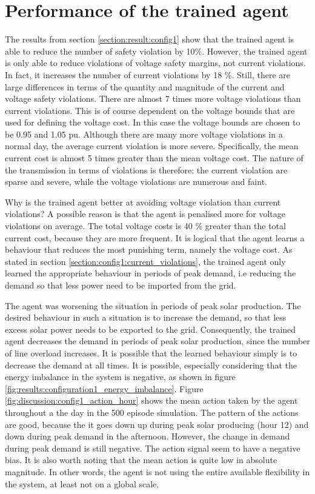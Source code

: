 \documentclass[class=book, crop=false]{standalone}
\begin{document}
\section{Performance of the trained agent}
The results from section \ref{section:result:config1} show that the trained agent is able to reduce the number of safety violation by 10\%. However, the trained agent is only able to reduce violations of voltage safety margins, not current violations. In fact, it increases the number of current violations by 18 \%. Still, there are large differences in terms of the quantity and magnitude of the current and voltage safety violations. There are almost 7 times more voltage violations than current violations. This is of course dependent on the voltage bounds that are used for defining the voltage cost. In this case the voltage bounds are chosen to be 0.95 and 1.05 pu. Although there are many more voltage violations in a normal day, the average current violation is more severe. Specifically, the mean current cost is almost 5 times greater than the mean voltage cost. The nature of the transmission in terms of violations is therefore: the current violation are sparse and severe, while the voltage violations are numerous and faint. 

Why is the trained agent better at avoiding voltage violation than current violations? A possible reason is that the agent is penalised more for voltage violations on average. The total voltage costs is 40 \% greater than the total current cost, because they are more frequent. It is logical that the agent learns a behaviour that reduces the most punishing term, namely the voltage cost. As stated in section \ref{section:config1:current_violations}, the trained agent only learned the appropriate behaviour in periods of peak demand, i.e reducing the demand so that less power need to be imported from the grid.

The agent was worsening the situation in periods of peak solar production. The desired behaviour in such a situation is to increase the demand, so that less excess solar power needs to be exported to the grid. Consequently, the trained agent decreases the demand in periods of peak solar production, since the number of line overload increases. It is possible that the learned behaviour simply is to decrease the demand at all times. It is possible, especially considering that the energy imbalance in the system is negative, as shown in figure \ref{fig:results:configuration1_energy_imbalance}. Figure \ref{fig:discussion:config1_action_hour} shows the mean action taken by the agent throughout a the day in the 500 episode simulation. The pattern of the actions are good, because the it goes down up during peak solar producing (hour 12) and down during peak demand in the afternoon. However, the change in demand during peak demand is still negative. The action signal seem to have a negative bias. It is also worth noting that the mean action is quite low in absolute magnitude. In other words, the agent is not using the entire available flexibility in the system, at least not on a global scale.
\end{document}
